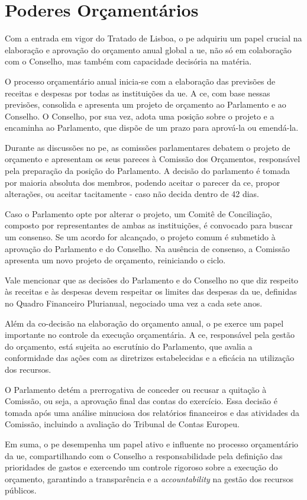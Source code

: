 \section{Poderes Orçamentários}

Com a entrada em vigor do Tratado de Lisboa, o \acrshort{pe} adquiriu um papel crucial na elaboração e aprovação do orçamento anual global a \acrshort{ue}, não só em colaboração com o Conselho, mas também com capacidade decisória na matéria.


O processo orçamentário anual inicia-se com a elaboração das previsões de receitas e despesas por todas as instituições da \acrshort{ue}. A \acrshort{ce}, com base nessas previsões, consolida e apresenta um projeto de orçamento ao Parlamento e ao Conselho. O Conselho, por sua vez, adota uma posição sobre o projeto e a encaminha ao Parlamento, que dispõe de um prazo para aprová-la ou emendá-la.

Durante as discussões no \acrshort{pe}, as comissões parlamentares debatem o projeto de orçamento e apresentam os seus pareces à Comissão dos Orçamentos, responsável pela preparação da posição do Parlamento. A decisão do parlamento é tomada por maioria absoluta dos membros, podendo aceitar o parecer da \acrshort{ce}, propor alterações, ou aceitar tacitamente - caso não decida dentro de 42 dias.


Caso o Parlamento opte por alterar o projeto, um Comitê de Conciliação, composto por representantes de ambas as instituições, é convocado para buscar um consenso. Se um acordo for alcançado, o projeto comum é submetido à aprovação do Parlamento e do Conselho. Na ausência de consenso, a Comissão apresenta um novo projeto de orçamento, reiniciando o ciclo.

Vale mencionar que as decisões do Parlamento e do Conselho no que diz respeito às receitas e às despesas devem respeitar os limites das despesas da \acrshort{ue}, definidas no Quadro Financeiro Plurianual, negociado uma vez a cada sete anos.


Além da co-decisão na elaboração do orçamento anual, o \acrshort{pe} exerce um papel importante no controle da execução orçamentária. A \acrshort{ce}, responsável pela gestão do orçamento, está sujeita ao escrutínio do Parlamento, que avalia a conformidade das ações com as diretrizes estabelecidas e a eficácia na utilização dos recursos.

O Parlamento detém a prerrogativa de conceder ou recusar a quitação à Comissão, ou seja, a aprovação final das contas do exercício. Essa decisão é tomada após uma análise minuciosa dos relatórios financeiros e das atividades da Comissão, incluindo a avaliação do Tribunal de Contas Europeu.

Em suma, o \acrshort{pe} desempenha um papel ativo e influente no processo orçamentário da \acrshort{ue}, compartilhando com o Conselho a responsabilidade pela definição das prioridades de gastos e exercendo um controle rigoroso sobre a execução do orçamento, garantindo a transparência e a \textit{accountability} na gestão dos recursos públicos.
